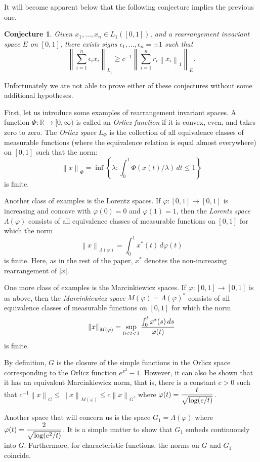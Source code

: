 \documentclass[numreferences]{kluwer}
\def\R{{\mathbb R}}
\def\normo#1{\left\|#1\right\|}
\def\modo#1{\left|#1\right|}
\newtheorem{Conjecture}[Theorem]{Conjecture}
\begin{document}
\begin{article}
It will become
apparent below that the following conjecture implies the previous
one.

\begin{Conjecture}
\label{sign-conj}  
Given $x_1,\dots,x_n \in L_1([0,1])$, 
and a rearrangement invariant space $E$ on $[0,1]$,
there exists signs $\epsilon_1,\dots,\epsilon_n = \pm 1$ such that
$$ \normo{\sum_{i=1}^n \epsilon_i x_i}_{L_1}
   \ge
   c^{-1}
   \normo{\sum_{i=1}^n r_i\normo{x_i}_1}_E .$$
\end{Conjecture}

Unfortunately we are not able to prove either of these conjectures
without some additional hypotheses.  

First,
let us introduce some examples of rearrangement invariant spaces.
A function $\Phi:\R\to[0,\infty)$ is called an {\it Orlicz function\/}
if it is convex, even, and takes zero to zero.  The {\it Orlicz space\/}
$L_\Phi$ is the collection of all equivalence classes of
measurable functions (where the equivalence relation is equal almost
everywhere) on $[0,1]$ such that
the norm:
$$ \normo x_\Phi = \inf\left\{ \lambda: \int_0^1 \Phi(x(t)/\lambda) \, dt
   \le 1 \right\} $$
is finite.

Another class of examples is the Lorentz spaces.  If $\varphi:[0,1]\to[0,1]$ is
increasing and concave with $\varphi(0)=0$ and $\varphi(1)=1$, then
the {\it Lorentz space\/} 
$\Lambda(\varphi)$ consists of all equivalence classes of
measurable functions on $[0,1]$ for
which the norm
$$ \normo x_{\Lambda(\varphi)}
   =
   \int_0^1 x^*(t) \, d\varphi(t) $$
is finite.  Here, as in the rest of the paper, $x^*$ denotes the non-increasing
rearrangement of $\modo x$.

One more class of examples is the Marcinkiewicz spaces.  
If $\varphi:[0,1]\to[0,1]$ is
as above,
then the {\it Marcinkiewicz space\/} $M(\varphi) = \Lambda(\varphi)^*$ 
consists of all equivalence classes of measurable functions on
$[0,1]$ for which the norm
$$ \normo x_{M(\varphi)}
   =
   \sup_{0<t<1} {\int_0^t x^*(s) \, ds \over \varphi(t)} $$
is finite.

By definition, $G$ 
is the closure of the simple functions
in the Orlicz space corresponding to the Orlicz function $e^{x^2}-1$.  
However, it can also be shown that it has an 
equivalent Marcinkiewicz norm, that is, there is a constant $c>0$ such that
$c^{-1} \normo x_G \le \normo x_{M(\varphi)} \le c \normo x_G$, where
$\varphi(t) = \displaystyle {t \over \sqrt{\log(e/t)}}$.

Another space that will concern us is the space $G_1 = \Lambda(\varphi)$
where $\varphi(t) = \displaystyle {2 \over \sqrt{\log(e^2/t)}}$.  It is a
simple matter to show that $G_1$ embeds continuously into $G$.  
Furthermore, for characteristic functions,
the norms on $G$ and $G_1$ coincide.


\end{article}
\end{document}
